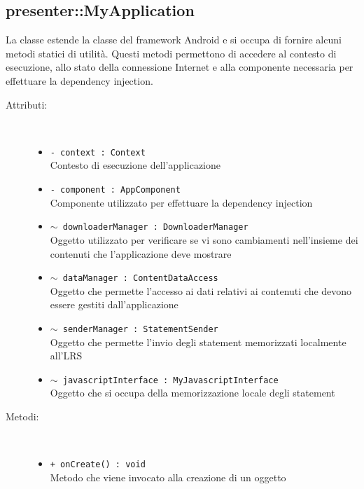 \documentclass[../Tesi.tex]{subfiles}
\begin{document}
		\subsection{presenter::MyApplication}
		La classe  estende la classe  del framework Android e si occupa di fornire alcuni metodi statici di utilità. Questi metodi permettono di accedere al contesto di esecuzione, allo stato della connessione Internet e alla componente necessaria per effettuare la dependency injection.
		\begin{description}
			\item[Attributi:] \
			\begin{itemize}
				\item \texttt{- context : Context}\\
				Contesto di esecuzione dell'applicazione

				\item \texttt{- component : AppComponent}\\
				Componente utilizzato per effettuare la dependency injection

				\item \texttt{$\sim$ downloaderManager : DownloaderManager}\\
				Oggetto utilizzato per verificare se vi sono cambiamenti nell'insieme dei contenuti che l'applicazione deve mostrare

				\item \texttt{$\sim$ dataManager : ContentDataAccess}\\
				Oggetto che permette l'accesso ai dati relativi ai contenuti che devono essere gestiti dall'applicazione

				\item \texttt{$\sim$ senderManager : StatementSender}\\
				Oggetto che permette l'invio degli statement memorizzati localmente all'LRS

				\item \texttt{$\sim$ javascriptInterface : MyJavascriptInterface}\\
				Oggetto che si occupa della memorizzazione locale degli statement
			\end{itemize}

			\item[Metodi:] \
			\begin{itemize}
				\item \texttt{+ onCreate() : void}\\
				Metodo che viene invocato alla creazione di un oggetto 
				

\end{itemize}
\end{description}
\end{document}
